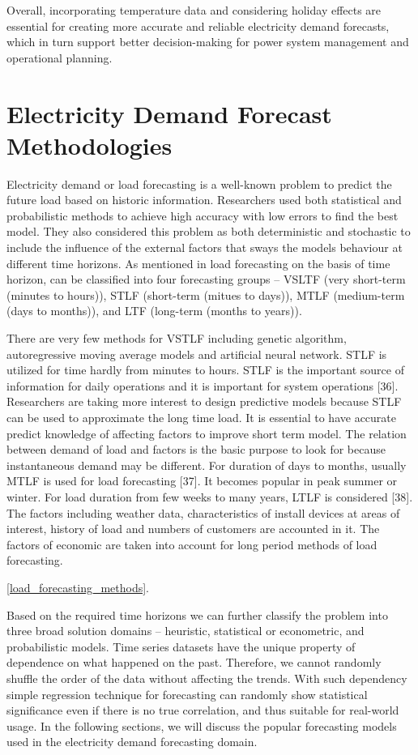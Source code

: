 \documentclass[mstat,12pt]{unswthesis}
\begin{document}
Overall, incorporating temperature data and considering holiday effects
are essential for creating more accurate and reliable electricity demand
forecasts, which in turn support better decision-making for power system
management and operational planning.

\section{Electricity Demand Forecast
Methodologies}\label{electricity-demand-forecast-methodologies}

Electricity demand or load forecasting is a well-known problem to
predict the future load based on historic information. Researchers used
both statistical and probabilistic methods to achieve high accuracy with
low errors to find the best model. They also considered this problem as
both deterministic and stochastic to include the influence of the
external factors that sways the models behaviour at different time
horizons. As mentioned in \cite{9812604} load forecasting on the basis
of time horizon, can be classified into four forecasting groups -- VSLTF
(very short-term (minutes to hours)), STLF (short-term (mitues to
days)), MTLF (medium-term (days to months)), and LTF (long-term (months
to years)).

There are very few methods for VSTLF including genetic algorithm,
autoregressive moving average models and artificial neural network. STLF
is utilized for time hardly from minutes to hours. STLF is the important
source of information for daily operations and it is important for
system operations {[}36{]}. Researchers are taking more interest to
design predictive models because STLF can be used to approximate the
long time load. It is essential to have accurate predict knowledge of
affecting factors to improve short term model. The relation between
demand of load and factors is the basic purpose to look for because
instantaneous demand may be different. For duration of days to months,
usually MTLF is used for load forecasting {[}37{]}. It becomes popular
in peak summer or winter. For load duration from few weeks to many
years, LTLF is considered {[}38{]}. The factors including weather data,
characteristics of install devices at areas of interest, history of load
and numbers of customers are accounted in it. The factors of economic
are taken into account for long period methods of load forecasting.

\ref{load_forecasting_methods}.

Based on the required time horizons we can further classify the problem
into three broad solution domains -- heuristic, statistical or
econometric, and probabilistic models. Time series datasets have the
unique property of dependence on what happened on the past. Therefore,
we cannot randomly shuffle the order of the data without affecting the
trends. With such dependency simple regression technique for forecasting
can randomly show statistical significance even if there is no true
correlation, and thus suitable for real-world usage. In the following
sections, we will discuss the popular forecasting models used in the
electricity demand forecasting domain.
\end{document}
